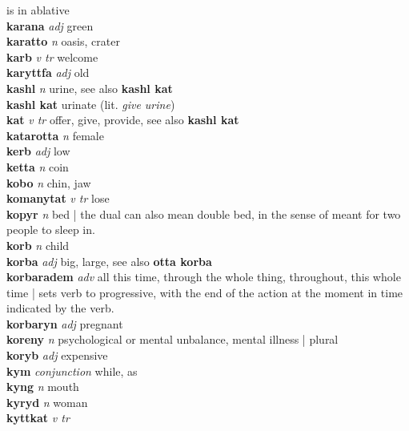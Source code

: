 is in ablative\\\textbf{karana}   \emph{adj} \textperiodcentered green\\\textbf{karatto}   \emph{n} \textperiodcentered oasis, crater\\\textbf{karb}   \emph{v tr} \textperiodcentered welcome\\\textbf{karyttfa}   \emph{adj} \textperiodcentered old\\\textbf{kashl}   \emph{n} \textperiodcentered urine, see also \textbf{kashl kat}\\\textbf{kashl kat}    \textperiodcentered urinate (lit. \emph{give urine})\\\textbf{kat}   \emph{v tr} \textperiodcentered offer, give, provide, see also \textbf{kashl kat}\\\textbf{katarotta}   \emph{n} \textperiodcentered female\\\textbf{kerb}   \emph{adj} \textperiodcentered low\\\textbf{ketta}   \emph{n} \textperiodcentered coin\\\textbf{kobo}   \emph{n} \textperiodcentered chin, jaw\\\textbf{komanytat}   \emph{v tr} \textperiodcentered lose\\\textbf{kopyr}   \emph{n} \textperiodcentered bed | the dual can also mean double bed, in the sense of meant for two people to sleep in.\\\textbf{korb}   \emph{n} \textperiodcentered child\\\textbf{korba}   \emph{adj} \textperiodcentered big, large, see also \textbf{otta korba}\\\textbf{korbaradem}   \emph{adv} \textperiodcentered all this time, through the whole thing, throughout, this whole time | sets verb to progressive, with the end of the action at the moment in time indicated by the verb.\\\textbf{korbaryn}   \emph{adj} \textperiodcentered pregnant\\\textbf{koreny}   \emph{n} \textperiodcentered psychological or mental unbalance, mental illness | plural\\\textbf{koryb}   \emph{adj} \textperiodcentered expensive\\\textbf{kym}   \emph{conjunction} \textperiodcentered while, as\\\textbf{kyng}   \emph{n} \textperiodcentered mouth\\\textbf{kyryd}   \emph{n} \textperiodcentered woman\\\textbf{kyttkat}   \emph{v tr} 